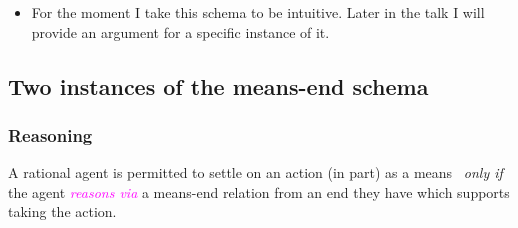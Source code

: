 \documentclass[10pt]{article}
\newenvironment{beamerblock}[1]{%
  \tcolorbox[standard,%
  no shadow,
  noparskip,
  colback=white,
  colframe=black,
  colbacktitle=white,
  coltitle=black,
  colupper=black,
  size=small,
  boxrule=.125mm,
  fonttitle=\bfseries,
  sharp corners=all,
  title=#1]}%
{\endtcolorbox}
\newcommand{\hozlinedash}[0]{%
  \noindent\hdashrule[0.5ex][c]{\textwidth}{.1pt}{2.5pt}
}
\newcommand{\schemaName}[1]{\textsf{#1}}
\begin{document}
\begin{itemize}
\item For the moment I take this schema to be intuitive.
  Later in the talk I will provide an argument for a specific instance of it.
\end{itemize}



\hozlinedash

\newpage

\subsection{Two instances of the means-end schema}
\label{sec:two-instances-means}

\subsubsection{Reasoning}
\label{sec:reasoning}

\begin{beamerblock}{\schemaName{Reasoning}}
  A rational agent is permitted to settle on an action (in part) as a means
  \newline
  \mbox{ }\hfill\emph{only if}\hfill\mbox{ }
  \newline
  the agent \textcolor{fuchsia}{\emph{reasons via}} a means-end relation from an end they have which supports taking the action.
\end{beamerblock}
\end{document}
